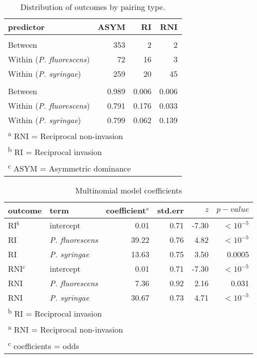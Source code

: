 \newpage
\begin{table}[!ht]

\caption{\label{tab:S2}Distribution of outcomes by pairing type.}
\centering
\begin{tabular}[t]{lrrr}
\toprule
predictor & ASYM & RI & RNI\\
\midrule
\addlinespace[0.3em]
\multicolumn{4}{l}{\textbf{Counts}}\\
\hspace{1em}Between & 353 & 2 & 2\\
\hspace{1em}Within (\textit{P. fluorescens}) & 72 & 16 & 3\\
\hspace{1em}Within (\textit{P. syringae}) & 259 & 20 & 45\\
\addlinespace[0.3em]
\multicolumn{4}{l}{\textbf{Frequencies}}\\
\hspace{1em}Between & 0.989 & 0.006 & 0.006\\
\hspace{1em}Within (\textit{P. fluorescens}) & 0.791 & 0.176 & 0.033\\
\hspace{1em}Within (\textit{P. syringae}) & 0.799 & 0.062 & 0.139\\
\bottomrule
\multicolumn{4}{l}{\textsuperscript{a} RNI = Reciprocal non-invasion}\\
\multicolumn{4}{l}{\textsuperscript{b} RI = Reciprocal invasion}\\
\multicolumn{4}{l}{\textsuperscript{c} ASYM = Asymmetric dominance}\\
\end{tabular}
\end{table}
\newpage
\begin{table}[!ht]

\caption{\label{tab:}Multinomial model coefficients}
\centering
\begin{tabular}[t]{llrrrr}
\toprule
outcome & term & coefficient$^{a}$ & std.err & $z$ & $p-value$\\
\midrule
RI$^{b}$ & intercept & 0.01 & 0.71 & -7.30 & $<10^{-5}$\\
RI & \textit{P. fluorescens} & 39.22 & 0.76 & 4.82 & $<10^{-5}$\\
RI & \textit{P. syringae} & 13.63 & 0.75 & 3.50 & 0.0005\\
RNI$^{c}$ & intercept & 0.01 & 0.71 & -7.30 & $<10^{-5}$\\
RNI & \textit{P. fluorescens} & 7.36 & 0.92 & 2.16 & 0.031\\
RNI & \textit{P. syringae} & 30.67 & 0.73 & 4.71 & $<10^{-5}$\\
\bottomrule
\multicolumn{6}{l}{\textsuperscript{b} RI = Reciprocal invasion}\\
\multicolumn{6}{l}{\textsuperscript{a} RNI = Reciprocal non-invasion}\\
\multicolumn{6}{l}{\textsuperscript{c} coefficients = odds}\\
\end{tabular}
\end{table}
